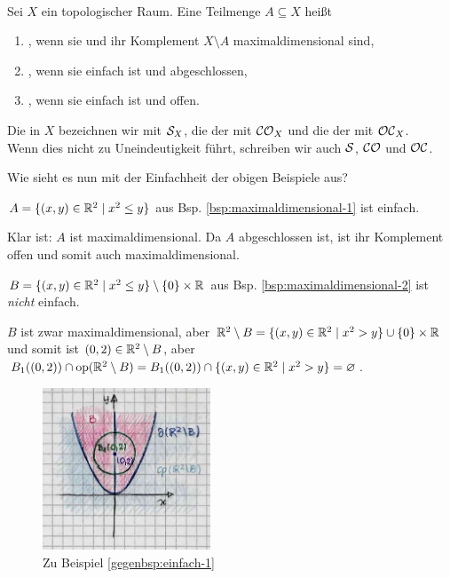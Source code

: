     \begin{dfn}\label{def:einf}\ \\
        Sei $X$ ein topologischer Raum. Eine Teilmenge $A \subseteq X$ heißt 
        \begin{enumerate}
            \item {}, wenn sie und ihr Komplement $X \setminus A$ maximaldimensional sind,
            \item {}, wenn sie einfach ist und abgeschlossen,
            \item {}, wenn sie einfach ist und offen.
        \end{enumerate}
        Die  in $X$ bezeichnen wir mit $\mathcal{S}_X$, die der  mit $\mathcal{CO}_X$ und die der  mit $\mathcal{OC}_X$.\\
        Wenn dies nicht zu Uneindeutigkeit führt, schreiben wir auch $\mathcal{S}$, $\mathcal{CO}$ und $\mathcal{OC}$.
    \end{dfn}
    
    Wie sieht es nun mit der Einfachheit der obigen Beispiele aus?
    \begin{bsp}\label{bsp:einfach}
        $A = \{(x,y) \in \mathbb{R}^2 \mid x^2 \leq y\}$ aus Bsp. \ref{bsp:maximaldimensional-1} ist einfach.
    \end{bsp}
    \begin{bew}
        Klar ist: $A$ ist maximaldimensional. Da $A$ abgeschlossen ist, ist ihr Komplement offen und somit auch maximaldimensional.
    \end{bew}

    \begin{gegenbsp}\label{gegenbsp:einfach-1}
        $B = \{(x,y) \in \mathbb{R}^2 \mid x^2 \leq y\} \setminus \{0\} \times \mathbb{R}$ aus Bsp. \ref{bsp:maximaldimensional-2} ist \textit{nicht} einfach.
    \end{gegenbsp}
    \begin{bew}
        $B$ ist zwar maximaldimensional, aber $\mathbb{R}^2 \setminus B = \{(x,y) \in \mathbb{R}^2 \mid x^2 > y\} \cup \{0\} \times \mathbb{R}$ und somit ist $(0,2) \in \mathbb{R}^2 \setminus B$, aber $B_1((0,2)) \cap \text{op}(\mathbb{R}^2 \setminus B) = B_1((0,2)) \cap \{(x,y) \in \mathbb{R}^2 \mid x^2 > y\} = \varnothing$.
    \end{bew}
    \begin{figure}[ht]
        \centering
        \includegraphics[width=5cm]{gfx/nicht-einfach.png}
        \caption{Zu Beispiel \ref{gegenbsp:einfach-1}}
        \label{fig:nicht-einfach}
    \end{figure}

